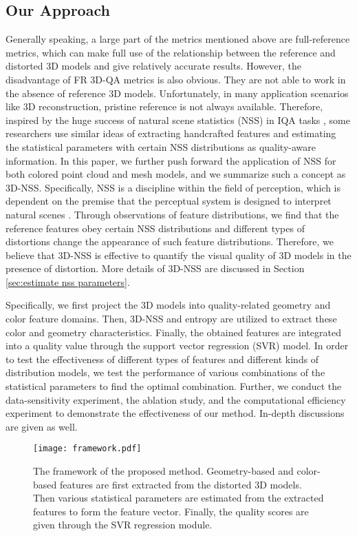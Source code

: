 \documentclass[lettersize,journal]{IEEEtran}
\begin{document}
\subsection{Our Approach}
Generally speaking, a large part of the metrics mentioned above are full-reference metrics, which can make full use of the relationship between the reference and distorted 3D models and give relatively accurate results. However, the disadvantage of FR 3D-QA metrics is also obvious. They are not able to work in the absence of reference 3D models. Unfortunately, in many application scenarios like 3D reconstruction, pristine reference is not always available.  {Therefore, inspired by the huge success of natural scene statistics (NSS) in IQA tasks \cite{brisque,nss1,nss2}, some researchers \cite{lin2019blind,abouelaziz2018blind,nr-svr} use similar ideas of extracting handcrafted features and estimating the statistical parameters with certain NSS distributions as quality-aware information. In this paper, we further push forward the application of NSS for both colored point cloud and mesh models, and we summarize such a concept as 3D-NSS.} Specifically, NSS is a discipline within the field of perception, which is dependent on the premise that the perceptual system is designed to interpret natural scenes \cite{nss2}. Through observations of feature distributions, we find that the reference features obey certain NSS distributions and different types of distortions change the appearance of such feature distributions. Therefore, we believe that 3D-NSS is effective to quantify the visual quality of 3D models in the presence of distortion. More details of 3D-NSS are discussed in Section \ref{sec:estimate nss parameters}.  


Specifically, we first project the 3D models into quality-related geometry and color feature domains. Then, 3D-NSS and entropy are utilized to extract these color and geometry characteristics. Finally, the obtained features are integrated into a quality value through the support vector regression (SVR) model. In order to test the effectiveness of different types of features and different kinds of distribution models, we test the performance of various combinations of the statistical parameters to find the optimal combination. Further, we conduct the data-sensitivity experiment, the ablation study, and the computational efficiency experiment to demonstrate the effectiveness of our method. In-depth discussions are given as well.   

\begin{figure*}[t]
    \centering
    \texttt{[image: framework.pdf]}
    \caption{The framework of the proposed method. Geometry-based and color-based features are first extracted from the distorted 3D models. Then various statistical parameters are estimated from the extracted features to form the feature vector. Finally, the quality scores are given through the SVR regression module.}
    \label{fig:framework}
    \vspace{-0.5cm}
\end{figure*}
\end{document}
